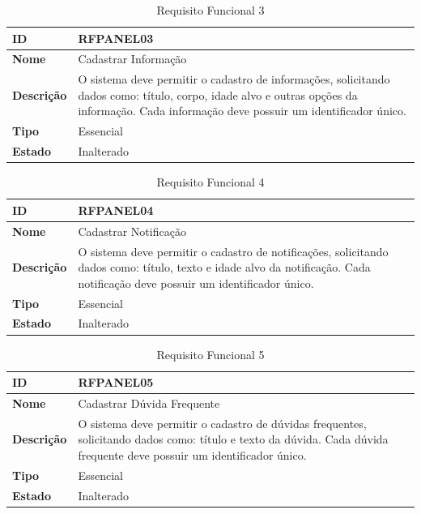 \begin{table}[H]
\centering
\begin{tabular}{|l|p{12cm}|}
\hline
\textbf{ID} & RFPANEL03 \\
\hline
\textbf{Nome} & Cadastrar Informação \\
\hline
\textbf{Descrição} & O sistema deve permitir o cadastro de informações, solicitando dados como: título, corpo, idade alvo e outras opções da informação. Cada informação deve possuir um identificador único. \\
\hline
\textbf{Tipo} & Essencial \\
\hline
\textbf{Estado} & Inalterado \\
\hline
\end{tabular}
\caption[RFPANEL03 -- Cadastrar informação]{Requisito Funcional 3}
\label{tab:rfpanel03}
\end{table}

\begin{table}[H]
\centering
\begin{tabular}{|l|p{12cm}|}
\hline
\textbf{ID} & RFPANEL04 \\
\hline
\textbf{Nome} & Cadastrar Notificação \\
\hline
\textbf{Descrição} & O sistema deve permitir o cadastro de notificações, solicitando dados como: título, texto e idade alvo da notificação. Cada notificação deve possuir um identificador único. \\
\hline
\textbf{Tipo} & Essencial \\
\hline
\textbf{Estado} & Inalterado \\
\hline
\end{tabular}
\caption[RFPANEL04 -- Cadastrar notificação]{Requisito Funcional 4}
\label{tab:rfpanel04}
\end{table}

\begin{table}[H]
\centering
\begin{tabular}{|l|p{12cm}|}
\hline
\textbf{ID} & RFPANEL05 \\
\hline
\textbf{Nome} & Cadastrar Dúvida Frequente \\
\hline
\textbf{Descrição} & O sistema deve permitir o cadastro de dúvidas frequentes, solicitando dados como: título e texto da dúvida. Cada dúvida frequente deve possuir um identificador único. \\
\hline
\textbf{Tipo} & Essencial \\
\hline
\textbf{Estado} & Inalterado \\
\hline
\end{tabular}
\caption[RFPANEL05 -- Cadastrar dúvida frequente]{Requisito Funcional 5}
\label{tab:rfpanel05}
\end{table}

